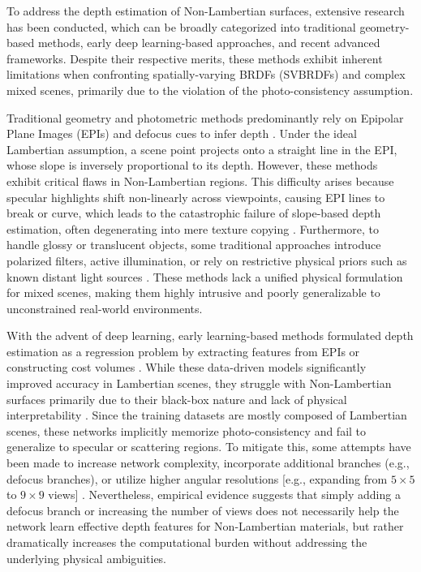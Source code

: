 \documentclass[lettersize,journal]{IEEEtran}
\begin{document}
To address the depth estimation of Non-Lambertian surfaces, extensive research has been conducted, which can be broadly categorized into traditional geometry-based methods, early deep learning-based approaches, and recent advanced frameworks. Despite their respective merits, these methods exhibit inherent limitations when confronting spatially-varying BRDFs (SVBRDFs) and complex mixed scenes, primarily due to the violation of the photo-consistency assumption.

Traditional geometry and photometric methods predominantly rely on Epipolar Plane Images (EPIs) and defocus cues to infer depth \cite{traditionalEPImethodsdefocu}. Under the ideal Lambertian assumption, a scene point projects onto a straight line in the EPI, whose slope is inversely proportional to its depth. However, these methods exhibit critical flaws in Non-Lambertian regions. This difficulty arises because specular highlights shift non-linearly across viewpoints, causing EPI lines to break or curve, which leads to the catastrophic failure of slope-based depth estimation, often degenerating into mere texture copying \cite{EPIfailuretexturecopying}. Furthermore, to handle glossy or translucent objects, some traditional approaches introduce polarized filters, active illumination, or rely on restrictive physical priors such as known distant light sources \cite{polarizedfiltersknownlight}. These methods lack a unified physical formulation for mixed scenes, making them highly intrusive and poorly generalizable to unconstrained real-world environments.

With the advent of deep learning, early learning-based methods formulated depth estimation as a regression problem by extracting features from EPIs or constructing cost volumes \cite{EPINetcostvolume}. While these data-driven models significantly improved accuracy in Lambertian scenes, they struggle with Non-Lambertian surfaces primarily due to their black-box nature and lack of physical interpretability \cite{lackofphysicalinterpretabil}. Since the training datasets are mostly composed of Lambertian scenes, these networks implicitly memorize photo-consistency and fail to generalize to specular or scattering regions. To mitigate this, some attempts have been made to increase network complexity, incorporate additional branches (e.g., defocus branches), or utilize higher angular resolutions  [e.g., expanding from $5 \times 5$ to $9 \times 9$ views] \cite{MaterialDualCueNethigherangu}. Nevertheless, empirical evidence suggests that simply adding a defocus branch or increasing the number of views does not necessarily help the network learn effective depth features for Non-Lambertian materials, but rather dramatically increases the computational burden without addressing the underlying physical ambiguities.
\end{document}
